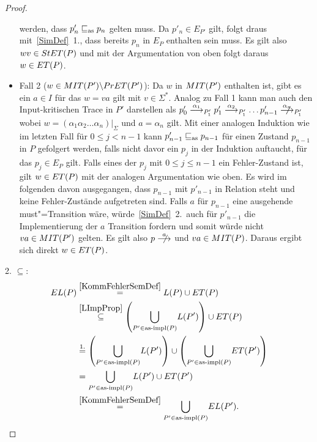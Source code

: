 \begin{proof}
\begin{itemize}
      werden, dass $p'_n\sqsubseteq _{\mathrm{as}} p_n$ gelten muss. Da $p'_n\in E_{P'}$ gilt,
      folgt draus mit~\ref{SimDef}~1., dass bereits $p_n$ in $E_P$ enthalten
      sein muss. Es gilt also $wv\in StET (P)$ und mit der Argumentation von
      oben folgt daraus $w\in ET (P)$.
    \item Fall 2 ($w\in MIT (P')\backslash PrET (P')$): Da $w$ in $MIT (P')$
      enthalten ist, gibt es ein $a\in I$ für das $w=va$ gilt mit $v\in\Sigma
      ^*$. Analog zu Fall 1 kann man auch den Input-kritischen Trace in $P'$
      darstellen als $p'_0 \must[\alpha _1]_{P'_1} p'_1 \must[\alpha _2]_{P'_1}
      \dots p'_{n-1} \nmust[\alpha _n]_{P'_1}$ wobei $w = (\alpha _1\alpha _2
      \dots \alpha _n)|_{\Sigma}$ und $a=\alpha _n$ gilt. Mit einer analogen
      Induktion wie im letzten Fall für $0\leq j < n-1$ kann $p'_{n-1}\sqsubseteq _{\mathrm{as}}
      p_{n-1}$ für einen Zustand $p_{n-1}$ in $P$ gefolgert werden, falls nicht
      davor ein $p_j$ in der Induktion auftaucht, für das $p_j\in E_P$ gilt.
      Falls eines der $p_j$ mit $0\leq j \leq n-1$ ein Fehler-Zustand ist, gilt
      $w\in ET (P)$ mit der analogen Argumentation wie oben. Es wird im
      folgenden davon ausgegangen, dass $p_{n-1}$ mit $p'_{n-1}$ in Relation
      steht und keine Fehler-Zustände aufgetreten sind. Falls $a$ für $p_{n-1}$
      eine ausgehende must"=Transition wäre, würde~\ref{SimDef}~2.\ auch für
      $p'_{n-1}$ die Implementierung der $a$ Transition fordern und somit würde
      nicht $va\in MIT (P')$ gelten. Es gilt also $p\nmust[a]$ und $va\in MIT
      (P)$. Daraus ergibt sich direkt $w\in ET (P)$.
  \end{itemize}

  2. \glqq$\subseteq$\grqq{}:
  {\allowdisplaybreaks
  \begin{align*}
    EL (P)&\overset{\ref{KommFehlerSemDef}}{=} L(P)\cup ET (P)\\
    &\overset{\ref{LImpProp}}{\subseteq} \left(\underset{P'\in\mathrm{as}\text{-}\mathrm{impl}
    (P)}{\bigcup} L (P')\right)\cup ET (P)\\
    &\overset{1.}{=} \left(\underset{P'\in\mathrm{as}\text{-}\mathrm{impl} (P)}{\bigcup} L
    (P')\right)\cup \left(\underset{P'\in\mathrm{as}\text{-}\mathrm{impl} (P)}{\bigcup} ET (P')\right)\\
    &= \underset{P'\in\mathrm{as}\text{-}\mathrm{impl} (P)}{\bigcup} L (P')\cup ET (P')\\
    &\overset{\ref{KommFehlerSemDef}}{=} \underset{P'\in\mathrm{as}\text{-}\mathrm{impl} (P)}{\bigcup}
    EL (P').\\
  \end{align*}}


\end{proof}
